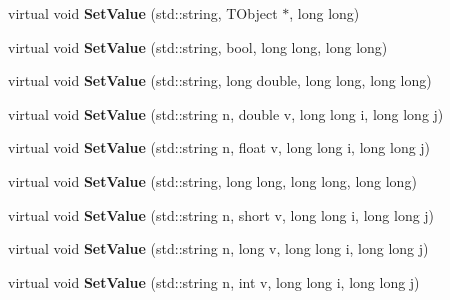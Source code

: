 \begin{DoxyCompactItemize}
\item 
\hypertarget{class_h_a_l_1_1_analysis_data_acd41ef9775be080bffca3f73d85cc823}{virtual void {\bfseries Set\-Value} (std\-::string, T\-Object $\ast$, long long)}\label{class_h_a_l_1_1_analysis_data_acd41ef9775be080bffca3f73d85cc823}

\item 
\hypertarget{class_h_a_l_1_1_analysis_data_a73b96c892a5d22e10353492716a4debc}{virtual void {\bfseries Set\-Value} (std\-::string, bool, long long, long long)}\label{class_h_a_l_1_1_analysis_data_a73b96c892a5d22e10353492716a4debc}

\item 
\hypertarget{class_h_a_l_1_1_analysis_data_a88c1c7b05e1d6a810f6278e760f31713}{virtual void {\bfseries Set\-Value} (std\-::string, long double, long long, long long)}\label{class_h_a_l_1_1_analysis_data_a88c1c7b05e1d6a810f6278e760f31713}

\item 
\hypertarget{class_h_a_l_1_1_analysis_data_ae47e20f22af2b66de78847abf701090f}{virtual void {\bfseries Set\-Value} (std\-::string n, double v, long long i, long long j)}\label{class_h_a_l_1_1_analysis_data_ae47e20f22af2b66de78847abf701090f}

\item 
\hypertarget{class_h_a_l_1_1_analysis_data_ada3c965834d61002c26111978dcbc901}{virtual void {\bfseries Set\-Value} (std\-::string n, float v, long long i, long long j)}\label{class_h_a_l_1_1_analysis_data_ada3c965834d61002c26111978dcbc901}

\item 
\hypertarget{class_h_a_l_1_1_analysis_data_aedcc708a4b2f1ab5aaab3402a8faed93}{virtual void {\bfseries Set\-Value} (std\-::string, long long, long long, long long)}\label{class_h_a_l_1_1_analysis_data_aedcc708a4b2f1ab5aaab3402a8faed93}

\item 
\hypertarget{class_h_a_l_1_1_analysis_data_a0395eec14b1cccf4e2e0c50689fbebe3}{virtual void {\bfseries Set\-Value} (std\-::string n, short v, long long i, long long j)}\label{class_h_a_l_1_1_analysis_data_a0395eec14b1cccf4e2e0c50689fbebe3}

\item 
\hypertarget{class_h_a_l_1_1_analysis_data_a2de48f498c1809813987fb98a3896433}{virtual void {\bfseries Set\-Value} (std\-::string n, long v, long long i, long long j)}\label{class_h_a_l_1_1_analysis_data_a2de48f498c1809813987fb98a3896433}

\item 
\hypertarget{class_h_a_l_1_1_analysis_data_aae15d891851e7f13d17daa06410de476}{virtual void {\bfseries Set\-Value} (std\-::string n, int v, long long i, long long j)}\label{class_h_a_l_1_1_analysis_data_aae15d891851e7f13d17daa06410de476}


\end{DoxyCompactItemize}
